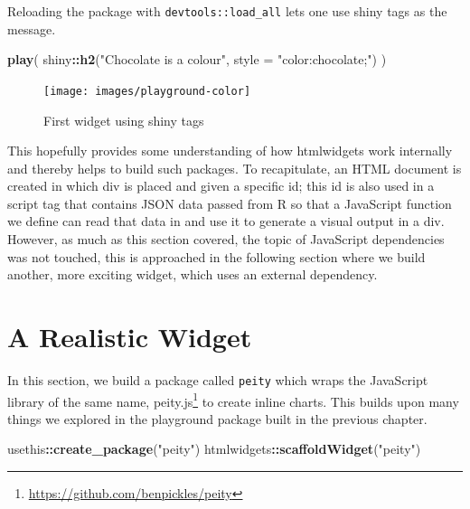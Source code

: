 \documentclass[10pt,]{krantz}
\makeatletter
\newenvironment{Shaded}{\begin{snugshade}}{\end{snugshade}}
\newcommand{\DataTypeTok}[1]{\textcolor[rgb]{0.27,0.27,0.27}{#1}}
\newcommand{\KeywordTok}[1]{\textcolor[rgb]{0.27,0.27,0.27}{\textbf{#1}}}
\newcommand{\NormalTok}[1]{#1}
\newcommand{\OperatorTok}[1]{\textcolor[rgb]{0.43,0.43,0.43}{\textbf{#1}}}
\newcommand{\StringTok}[1]{\textcolor[rgb]{0.5,0.5,0.5}{#1}}
\renewcommand{\href}[2]{#2\footnote{\url{#1}}}
\newenvironment{kframe}{%
\medskip{}
\setlength{\fboxsep}{.8em}
 \def\at@end@of@kframe{}%
 \ifinner\ifhmode%
  \def\at@end@of@kframe{\end{minipage}}%
  \begin{minipage}{\columnwidth}%
 \fi\fi%
 \def\FrameCommand##1{\hskip\@totalleftmargin \hskip-\fboxsep
 \colorbox{shadecolor}{##1}\hskip-\fboxsep
     \hskip-\linewidth \hskip-\@totalleftmargin \hskip\columnwidth}%
 \MakeFramed {\advance\hsize-\width
   \@totalleftmargin\z@ \linewidth\hsize
   \@setminipage}}%
 {\par\unskip\endMakeFramed%
 \at@end@of@kframe}
\renewenvironment{Shaded}{\begin{kframe}}{\end{kframe}}
\makeatother
\begin{document}
Reloading the package with \texttt{devtools::load\_all} lets one use shiny tags as the message.

\begin{Shaded}
\begin{Highlighting}[]
\KeywordTok{play}\NormalTok{(}
\NormalTok{  shiny}\OperatorTok{::}\KeywordTok{h2}\NormalTok{(}\StringTok{"Chocolate is a colour"}\NormalTok{, }\DataTypeTok{style =} \StringTok{"color:chocolate;"}\NormalTok{)}
\NormalTok{)}
\end{Highlighting}
\end{Shaded}

\begin{figure}[H]

{\centering \texttt{[image: images/playground-color]} 

}

\caption{First widget using shiny tags}\label{fig:playground-tags}
\end{figure}

This hopefully provides some understanding of how htmlwidgets work internally and thereby helps to build such packages. To recapitulate, an HTML document is created in which div is placed and given a specific id; this id is also used in a script tag that contains JSON data passed from R so that a JavaScript function we define can read that data in and use it to generate a visual output in a div. However, as much as this section covered, the topic of JavaScript dependencies was not touched, this is approached in the following section where we build another, more exciting widget, which uses an external dependency.

\hypertarget{widgets-realistic}{%
\chapter{A Realistic Widget}\label{widgets-realistic}}

In this section, we build a package called \texttt{peity} which wraps the JavaScript library of the same name, \href{https://github.com/benpickles/peity}{peity.js} to create inline charts. This builds upon many things we explored in the playground package built in the previous chapter.

\begin{Shaded}
\begin{Highlighting}[]
\NormalTok{usethis}\OperatorTok{::}\KeywordTok{create_package}\NormalTok{(}\StringTok{"peity"}\NormalTok{)}
\NormalTok{htmlwidgets}\OperatorTok{::}\KeywordTok{scaffoldWidget}\NormalTok{(}\StringTok{"peity"}\NormalTok{)}
\end{Highlighting}
\end{Shaded}
\end{document}
